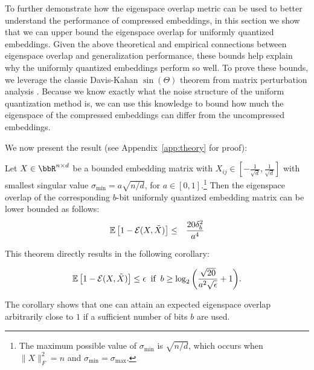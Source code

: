 To further demonstrate how the eigenspace overlap metric can be used to better understand the performance of compressed embeddings, in this section we show that we can upper bound the eigenspace overlap for uniformly quantized embeddings.
Given the above theoretical and empirical connections between eigenspace overlap and generalization performance, these bounds help explain why the uniformly quantized embeddings perform so well.
To prove these bounds, we leverage the classic Davis-Kahan $\sin(\Theta)$ theorem from matrix perturbation analysis \citep{sintheta70}.
Because we know exactly what the noise structure of the uniform quantization method is, we can use this knowledge to bound how much the eigenspace of the compressed embeddings can differ from the uncompressed embeddings.

We now present the result (see Appendix~\ref{app:theory} for proof):
\begin{theorem}
	Let $X \in \RR^{n\times d}$ be a bounded embedding matrix with $X_{ij} \in [-\frac{1}{\sqrt{d}},\frac{1}{\sqrt{d}}]$ with smallest singular value $\sigma_{\min} = a \sqrt{n/d}$, for $a \in [0,1]$.\footnote{The maximum possible value of $\sigma_{\min}$ is $\sqrt{n/d}$, which occurs when $\|X\|_F^2 = n$ and $\sigma_{\min} = \sigma_{\max}$. }
	Then the eigenspace overlap of the corresponding $b$-bit uniformly quantized embedding matrix can be lower bounded as follows:
	\begin{eqnarray*}
		\expect{}{1-\eigover(X,\tX)} &\leq& \frac{20 \delta_b^2}{a^4}
	\end{eqnarray*}
\label{thm1}
\end{theorem}

This theorem directly results in the following corollary:
\begin{corollary}
	$$\expect{}{1-\eigover(X,\tX)} \leq \eps \;\;\text{if}\;\; b \geq \log_2\bigg(\frac{\sqrt{20}}{a^2\sqrt{\eps}}+1\bigg).$$
\end{corollary}
The corollary shows that one can attain an expected eigenspace overlap arbitrarily close to $1$ if a sufficient number of bits $b$ are used.


